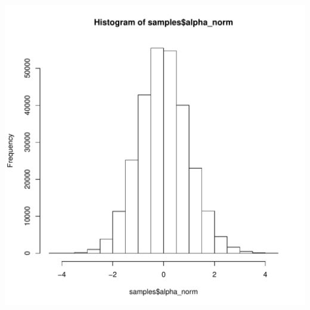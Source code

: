 \documentclass{article}\usepackage[]{graphicx}\usepackage[]{color}
\newenvironment{knitrout}{}{} %
\begin{document}
\begin{knitrout}
\includegraphics[width=5.5in]{figure/p3cCompleteHist-3} 

\end{knitrout}
\end{document}
